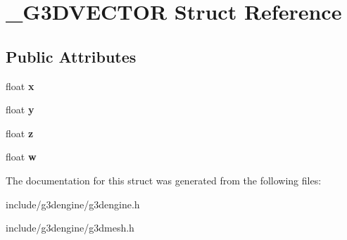 \hypertarget{struct__G3DVECTOR}{}\section{\+\_\+\+G3\+D\+V\+E\+C\+T\+OR Struct Reference}
\label{struct__G3DVECTOR}
\subsection*{Public Attributes}
\begin{DoxyCompactItemize}
\item 
\mbox{\label{struct__G3DVECTOR_a7b3adb2448c0cf55ff5ae71ae313f1df}} 
float {\bfseries x}
\item 
\mbox{\label{struct__G3DVECTOR_aaf54d41aa60f062fbfa61851f6b5ac38}} 
float {\bfseries y}
\item 
\mbox{\label{struct__G3DVECTOR_a8d5da44f3f49ee6d688ff432bd76f9b6}} 
float {\bfseries z}
\item 
\mbox{\label{struct__G3DVECTOR_a01cd4d224eb4c9b21ca60cd1b24b6204}} 
float {\bfseries w}
\end{DoxyCompactItemize}


The documentation for this struct was generated from the following files\+:\begin{DoxyCompactItemize}
\item 
include/g3dengine/g3dengine.\+h\item 
include/g3dengine/g3dmesh.\+h\end{DoxyCompactItemize}
